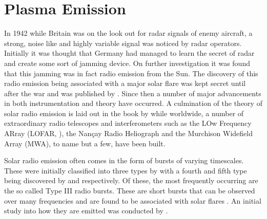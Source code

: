 

\section{Plasma Emission}
\label{sec:plasma}
In 1942 while Britain was on the look out for radar signals of enemy aircraft, a strong, noise like and highly variable signal was noticed by radar operators. Initially it was thought that Germany had managed to learn the secret of radar and create some sort of jamming device. On further investigation it was found that this jamming was in fact radio emission from the Sun. The discovery of this radio emission being associated with a major solar flare was kept secret until after the war and was published by \cite{Appleton1946}.
Since then a number of major advancements in both instrumentation and theory have occurred. A culmination of the theory of solar radio emission is laid out in the book by \cite{McLean1985} while worldwide, a number of extraordinary radio telescopes and interferometers such as the LOw Frequency ARray (LOFAR, \citeauthor{VanHaarlem2013b} \citeyear{VanHaarlem2013b}), the Nan\c{c}ay Radio Heliograph and the Murchison Widefield Array (MWA), to name but a few, have been built.

Solar radio emission often comes in the form of bursts of varying timescales. These were initially classified into three types by \cite{Wild1950b} with a fourth and fifth type being discovered by \cite{Boischot1957} and \cite{Wild1959} respectively. Of these, the most frequently occurring are the so called Type III radio bursts. These are short bursts that can be observed over many frequencies and are found to be associated with solar flares \citep{Malville1962}. An initial study into how they are emitted was conducted by \cite{Ginzburg1958}.%

